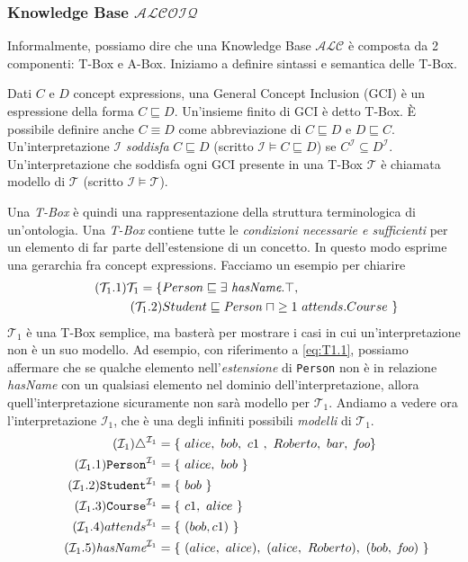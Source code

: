 \subsubsection*{Knowledge Base $\mathcal{ALCOIQ}$}
\label{sec:KB}
Informalmente, possiamo dire che una Knowledge Base $\mathcal{ALC}$ è composta da 2 componenti: T-Box e A-Box. Iniziamo a definire sintassi e semantica delle T-Box.
\begin{definition}
	Dati $C$ e $D$ concept expressions, una General Concept Inclusion (GCI) è un espressione della forma $C \sqsubseteq D$. Un'insieme finito di GCI è detto T-Box. È possibile definire anche $C \equiv D$ come abbreviazione di $C \sqsubseteq D$ e $D \sqsubseteq C$.\\
	Un'interpretazione $\mathcal{I}$ \textit{soddisfa} $C \sqsubseteq D$ (scritto $\mathcal{I} \models C \sqsubseteq D $) se $C^\mathcal{I} \subseteq D^\mathcal{I}$. Un'interpretazione che soddisfa ogni GCI presente in una T-Box $\mathcal{T}$ è chiamata modello di $\mathcal{T}$ (scritto $\mathcal{I} \models \mathcal{T}$).
\end{definition}
\noindent
Una \textit{T-Box} è quindi una rappresentazione della struttura terminologica di un’ontologia. Una \textit{T-Box} contiene tutte le \textit{condizioni necessarie e sufficienti} per un elemento di far parte dell'estensione di un concetto. In questo modo esprime una gerarchia fra concept expressions. Facciamo un esempio per chiarire
\begin{align}
	\tag{$\mathcal{T}_1$.1} \label{eq:T1.1}
	\mathcal{T}_1 = \{&Person \sqsubseteq \exists\ \textit{hasName}.\top,\\
	\tag{$\mathcal{T}_1$.2} \label{eq:T1.2}
	&Student \sqsubseteq \textit{Person}\ \sqcap \ge 1\ attends.Course\ \}
\end{align}
$\mathcal{T}_1$ è una T-Box semplice, ma basterà per mostrare i casi in cui un'interpretazione non è un suo modello. Ad esempio, con riferimento a \eqref{eq:T1.1}, possiamo affermare che se qualche elemento nell'\textit{estensione} di \texttt{Person} non è in relazione \textit{hasName} con un qualsiasi elemento nel dominio dell'interpretazione, allora quell'interpretazione sicuramente non sarà modello per $\mathcal{T}_1$. Andiamo a vedere ora l'interpretazione $\mathcal{I}_1$, che è una degli infiniti possibili \textit{modelli} di $\mathcal{T}_1$.
\begin{align}
	\tag{$\mathcal{I}_1$} \label{eq:I1}
	\triangle^{\mathcal{I}_1} &= \{\ alice,\ bob,\ c1\ ,\ Roberto,\ bar,\ \textit{foo}\}\\
	\tag{$\mathcal{I}_1$.1} \label{eq:I1.1}
	\texttt{Person}^{\mathcal{I}_1} &= \{\ alice,\ bob\ \}\\
	\tag{$\mathcal{I}_1$.2} \label{eq:I1.2}
	\texttt{Student}^{\mathcal{I}_1} &= \{\ bob\ \} \\
	\tag{$\mathcal{I}_1$.3} \label{eq:I1.3}
	\texttt{Course}^{\mathcal{I}_1} &= \{\ c1,\ alice\ \}\\
	\tag{$\mathcal{I}_1$.4} \label{eq:I1.4}
	attends^{\mathcal{I}_1} &= \{\ (bob, c1)\ \}\\
	\tag{$\mathcal{I}_1$.5} \label{eq:I1.5}
	\textit{hasName}^{\mathcal{I}_1} &= \{\ (alice,\ alice),\ (alice,\ Roberto),\ (bob,\ \textit{foo})\ \}
\end{align}
